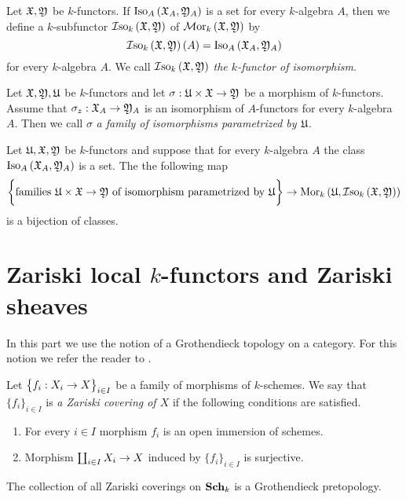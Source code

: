 \begin{definition}
Let ${\mathfrak X},{\mathfrak Y}$ be $k$-functors. If $\mathrm{Iso}_{A}\left({\mathfrak X}_A,{\mathfrak Y}_A\right)$ is a set for every $k$-algebra $A$, then we define a $k$-subfunctor $\mathcal{I}\mathrm{so}_k\left({\mathfrak X},{\mathfrak Y}\right)$ of $\mathcal{M}\mathrm{or}_k\left({\mathfrak X},{\mathfrak Y}\right)$ by
$$\mathcal{I}\mathrm{so}_k\left({\mathfrak X},{\mathfrak Y}\right)(A) = \mathrm{Iso}_A\left({\mathfrak X}_A,{\mathfrak Y}_A\right)$$
for every $k$-algebra $A$. We call $\mathcal{I}\mathrm{so}_k\left({\mathfrak X},{\mathfrak Y}\right)$ \textit{the $k$-functor of isomorphism}.
\end{definition}

\begin{definition}
Let ${\mathfrak X}, {\mathfrak Y},{\mathfrak U}$ be $k$-functors and let $\sigma:{\mathfrak U}\times {\mathfrak X} \rightarrow {\mathfrak Y}$ be a morphism of $k$-functors. Assume that $\sigma_z:{\mathfrak X}_A\rightarrow {\mathfrak Y}_A$ is an isomorphism of $A$-functors for every $k$-algebra $A$. Then we call $\sigma$ \textit{a family of isomorphisms parametrized by ${\mathfrak U}$}.
\end{definition}

\begin{corollary}\label{corollary:hom_isomorphism_bijection}
Let ${\mathfrak U},{\mathfrak X},{\mathfrak Y}$ be $k$-functors and suppose that for every $k$-algebra $A$ the class $\mathrm{Iso}_A\left({\mathfrak X}_A,{\mathfrak Y}_A\right)$ is a set. The the following map
$$\bigg\{\mbox{families }{\mathfrak U}\times {\mathfrak X}\rightarrow {\mathfrak Y}\mbox{ of isomorphism parametrized by }{\mathfrak U}\bigg\}\rightarrow \mathrm{Mor}_k\left({\mathfrak U},\mathcal{I}\mathrm{so}_k\left({\mathfrak X},{\mathfrak Y}\right)\right)$$
is a bijection of classes.
\end{corollary}


\section{Zariski local $k$-functors and Zariski sheaves}
\noindent
In this part we use the notion of a Grothendieck topology on a category. For this notion we refer the reader to \cite{Sheaves}.

\begin{definition}
Let $\big\{f_i:X_i\rightarrow X\big\}_{i\in I}$ be a family of morphisms of $k$-schemes. We say that $\{f_i\}_{i\in I}$ is \textit{a Zariski covering of $X$} if the following conditions are satisfied.
\begin{enumerate}[label=\textbf{(\arabic*)}, leftmargin=3.0em]
\item For every $i\in I$ morphism $f_i$ is an open immersion of schemes.
\item Morphism $\coprod_{i\in I}X_i\rightarrow X$ induced by $\big\{f_i\big\}_{i\in I}$ is surjective.
\end{enumerate}
\end{definition}
\noindent
The collection of all Zariski coverings on $\mathbf{Sch}_k$ is a Grothendieck pretopology.

